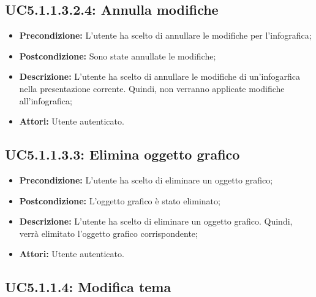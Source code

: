\subsection{ UC5.1.1.3.2.4: Annulla modifiche}

\begin{itemize}
	\item \textbf{Precondizione:} L'utente ha scelto di annullare le modifiche per l'infografica;
	\item \textbf{Postcondizione:} Sono state annullate le modifiche;
	\item \textbf{Descrizione:} L'utente ha scelto di annullare le modifiche di un'infogarfica nella presentazione corrente. Quindi, non verranno applicate modifiche all'infografica;
	\item \textbf{Attori:} Utente autenticato.
\end{itemize}
\subsection{ UC5.1.1.3.3: Elimina oggetto grafico}

\begin{itemize}
	\item \textbf{Precondizione:} L'utente ha scelto di eliminare un oggetto grafico;
	\item \textbf{Postcondizione:} L'oggetto grafico è stato eliminato;
	\item \textbf{Descrizione:} L'utente ha scelto di eliminare un oggetto grafico. Quindi, verrà elimitato l'oggetto grafico corrispondente;
	\item \textbf{Attori:} Utente autenticato.
\end{itemize}
\subsection{ UC5.1.1.4: Modifica tema}

